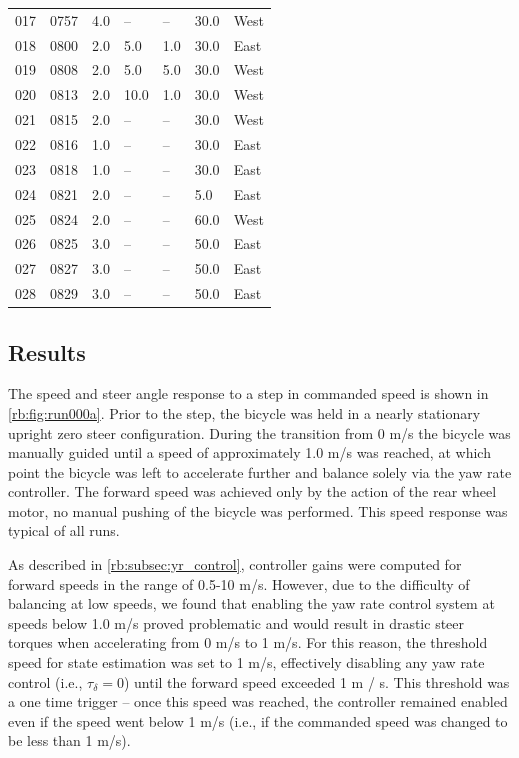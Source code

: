 \begin{center}
\begin{longtable}{lllllll}
  017 & 0757 & 4.0 & -- & -- & 30.0 & West \\
  018 & 0800 & 2.0 & 5.0 & 1.0 & 30.0 & East \\
  019 & 0808 & 2.0 & 5.0 & 5.0 & 30.0 & West \\
  020 & 0813 & 2.0 & 10.0 & 1.0 & 30.0 & West \\
  021 & 0815 & 2.0 & -- & -- & 30.0 & West \\
  022 & 0816 & 1.0 & -- & -- & 30.0 & East \\
  023 & 0818 & 1.0 & -- & -- & 30.0 & East \\
  024 & 0821 & 2.0 & -- & -- & 5.0 & East \\
  025 & 0824 & 2.0 & -- & -- & 60.0 & West \\
  026 & 0825 & 3.0 & -- & -- & 50.0 & East \\
  027 & 0827 & 3.0 & -- & -- & 50.0 & East \\
  028 & 0829 & 3.0 & -- & -- & 50.0 & East \\
  \bottomrule
  \end{longtable}
\end{center}

\subsection{Results} \label{rb:subsec:results}
The speed and steer angle response to a step in commanded speed is shown in
\autoref{rb:fig:run000a}. Prior to the step, the bicycle was held in a nearly
stationary upright zero steer configuration.  During the transition from 0 m/s
the bicycle was manually guided until a speed of approximately 1.0 m/s was
reached, at which point the bicycle was left to accelerate further and balance
solely via the yaw rate controller. The forward speed was achieved only by the
action of the rear wheel motor, no manual pushing of the bicycle was performed.
This speed response was typical of all runs.

As described in \autoref{rb:subsec:yr_control}, controller gains were computed
for forward speeds in the range of 0.5-10 m/s. However, due to the difficulty
of balancing at low speeds, we found that enabling the yaw rate control system
at speeds below 1.0 m/s proved problematic and would result in drastic steer
torques when accelerating from 0 m/s to 1 m/s. For this reason, the threshold
speed for state estimation was set to 1 m/s, effectively disabling any yaw rate
control (i.e., $\tau_\delta = 0$) until the forward speed exceeded 1 m / s. This
threshold was a one time trigger -- once this speed was reached, the controller
remained enabled even if the speed went below 1 m/s (i.e., if the commanded
speed was changed to be less than 1 m/s).

